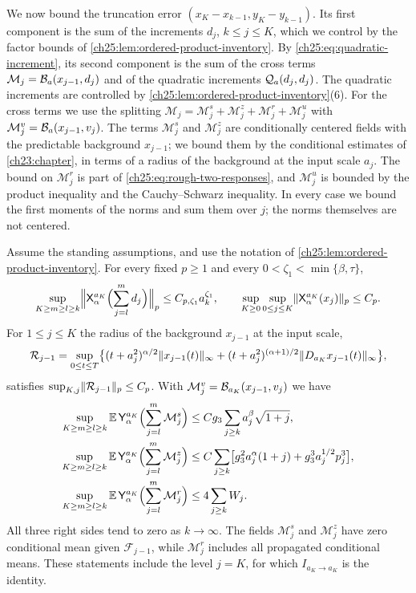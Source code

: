 We now bound the truncation error $(x_K-x_{k-1},y_K-y_{k-1})$. Its first component is the sum of the increments $d_j$, $k\le j\le K$, which we control by the factor bounds of \cref{ch25:lem:ordered-product-inventory}. By \eqref{ch25:eq:quadratic-increment}, its second component is the sum of the cross terms $\mathcal M_j=\mathcal B_{a}(x_{j-1},d_j)$ and of the quadratic increments $\mathcal Q_{a}(d_j,d_j)$. The quadratic increments are controlled by \cref{ch25:lem:ordered-product-inventory}(6). For the cross terms we use the splitting $\mathcal M_j=\mathcal M_j^s+\mathcal M_j^z+\mathcal M_j^r+\mathcal M_j^u$ with $\mathcal M_j^v=\mathcal B_{a}(x_{j-1},v_j)$. The terms $\mathcal M_j^s$ and $\mathcal M_j^z$ are conditionally centered fields with the predictable background $x_{j-1}$; we bound them by the conditional estimates of \cref{ch23:chapter}, in terms of a radius of the background at the input scale $a_j$. The bound on $\mathcal M_j^r$ is part of \eqref{ch25:eq:rough-two-responses}, and $\mathcal M_j^u$ is bounded by the product inequality and the Cauchy--Schwarz inequality. In every case we bound the first moments of the norms and sum them over $j$; the norms themselves are not centered.

\begin{theorem}\label{ch25:thm:all-prefix-first-grade}
Assume the standing assumptions, and use the notation of \cref{ch25:lem:ordered-product-inventory}. For every fixed $p\ge1$ and every $0<\zeta_1<\min\{\beta,\tau\}$,
\[
 \sup_{K\ge m\ge l\ge k}\Bigl\|\mathsf X_{\alpha}^{a_K}\Bigl(\sum_{j=l}^md_j\Bigr)\Bigr\|_p\le C_{p,\zeta_1}a_k^{\zeta_1},\qquad
 \sup_{K\ge0}\sup_{0\le j\le K}\lVert \mathsf X_{\alpha}^{a_K}(x_j)\rVert_p\le C_p.
\]
For $1\le j\le K$ the radius of the background $x_{j-1}$ at the input scale,
\[
 \mathcal R_{j-1}=\sup_{0\le t\le T}\bigl\{(t+a_j^2)^{\alpha/2}\lVert x_{j-1}(t)\rVert_\infty+(t+a_j^2)^{(\alpha+1)/2}\lVert D_{a_K}x_{j-1}(t)\rVert_\infty\bigr\},
\]
satisfies $\sup_{K,j}\lVert \mathcal R_{j-1}\rVert_p\le C_p$. With $\mathcal M_j^v=\mathcal B_{a_K}(x_{j-1},v_j)$ we have
\[
\begin{split}
 \sup_{K\ge m\ge l\ge k}\mathbb E\,\mathsf Y_{\alpha}^{a_K}\Bigl(\sum_{j=l}^m\mathcal M_j^s\Bigr)&\le Cg_3\sum_{j\ge k}a_j^\beta\sqrt{1+j},\\
 \sup_{K\ge m\ge l\ge k}\mathbb E\,\mathsf Y_{\alpha}^{a_K}\Bigl(\sum_{j=l}^m\mathcal M_j^z\Bigr)&\le C\sum_{j\ge k}\bigl[g_3^2a_j^\alpha(1+j)+g_3^3a_j^{1/2}p_j^3\bigr],\\
 \sup_{K\ge m\ge l\ge k}\mathbb E\,\mathsf Y_{\alpha}^{a_K}\Bigl(\sum_{j=l}^m\mathcal M_j^r\Bigr)&\le4\sum_{j\ge k}W_j.
\end{split}
\]
All three right sides tend to zero as $k\to\infty$. The fields $\mathcal M_j^s$ and $\mathcal M_j^z$ have zero conditional mean given $\mathcal F_{j-1}$, while $\mathcal M_j^r$ includes all propagated conditional means. These statements include the level $j=K$, for which $I_{a_K\to a_K}$ is the identity.
\end{theorem}

